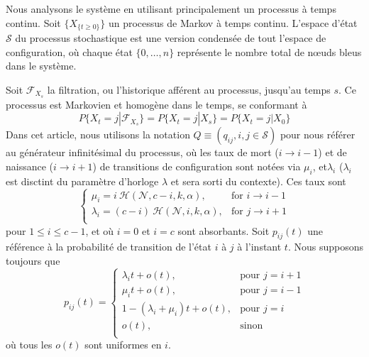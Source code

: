 \documentclass[letterpaper,twocolumn,10pt]{article}
\theoremstyle{definition}
\begin{document}
\begin{appendices}
Nous analysons le système en utilisant principalement un processus à temps continu. Soit $\{X_{\{t \geq 0\}}\}$ un processus de Markov à temps continu.
L'espace d'état $\mathcal{S}$ du processus stochastique est une version condensée de tout l'espace de configuration, où chaque état $\{0, \dots, n\}$ représente le nombre total de nœuds bleus dans le système.

Soit $\mathcal{F}_{X_s}$ la filtration, ou l'historique afférent au processus, jusqu'au temps $s$. Ce processus est Markovien et homogène dans le temps, se conformant à
\[
    P\{X_t = j | \mathcal{F}_{X_s}\} = P\{X_t = j | X_s\} = P\{X_t = j | X_0\}    
\]
Dans cet article, nous utilisons la notation $Q \equiv (q_{ij}, i, j \in \mathcal{S})$ pour nous référer au générateur infinitésimal du processus, où les taux de mort ($i \rightarrow i-1$) et de naissance ($i \rightarrow i+1$) de transitions de configuration sont notées via $\mu_i$, et$\lambda_i$ ($\lambda_ i$ est disctint du paramètre d'horloge $\lambda$ et sera sorti du contexte). Ces taux sont
\[
    \begin{cases}
        \mu_i = i\ \mathcal{H}(\mathcal{N}, c-i, k, \alpha), & \text{for } i \rightarrow i - 1 \\
        \lambda_i = (c-i)\ \mathcal{H}(\mathcal{N}, i, k, \alpha), & \text{for } j \rightarrow i + 1 \\
    \end{cases}
\]
pour $1\leq i\leq c-1$, et où $i = 0$ et $i = c$ sont absorbants. Soit $p_{ij}(t)$ une référence à la probabilité de transition de l'état $i$ à $j$ à l'instant $t$.
Nous supposons toujours que
\[
    p_{ij}(t) = 
    \begin{cases}
      \lambda_it + o(t), & \text{pour } j = i + 1 \\
      \mu_it + o(t), & \text{pour } j = i - 1 \\
      1 - (\lambda_i + \mu_i)t + o(t), & \text{pour } j = i \\
      o(t), & \text{sinon }\\
    \end{cases}
\]
où tous les $o(t)$ sont uniformes en $i$.


\end{appendices}
\end{document}
